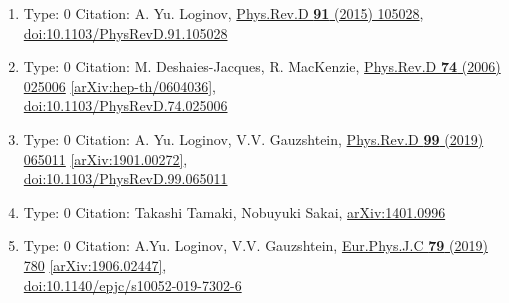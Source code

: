 \documentclass[a4paper,10pt]{article}
\begin{document}
\begin{enumerate}
\begin{enumerate}
  \item Type: 0 Citation: A. Yu. Loginov, \href{https://www.doi.org/10.1103/PhysRevD.91.105028}{Phys.Rev.D {\bf 91} (2015) 105028},\\\href{https://www.doi.org/10.1103/PhysRevD.91.105028}{doi:10.1103/PhysRevD.91.105028}
  \item Type: 0 Citation: M. Deshaies-Jacques, R. MacKenzie, \href{https://www.doi.org/10.1103/PhysRevD.74.025006}{Phys.Rev.D {\bf 74} (2006) 025006}  \href{https://arxiv.org/abs/hep-th/0604036}{[arXiv:hep-th/0604036]},\\\href{https://www.doi.org/10.1103/PhysRevD.74.025006}{doi:10.1103/PhysRevD.74.025006}
  \item Type: 0 Citation: A. Yu. Loginov, V.V. Gauzshtein, \href{https://www.doi.org/10.1103/PhysRevD.99.065011}{Phys.Rev.D {\bf 99} (2019) 065011}  \href{https://arxiv.org/abs/1901.00272}{[arXiv:1901.00272]},\\\href{https://www.doi.org/10.1103/PhysRevD.99.065011}{doi:10.1103/PhysRevD.99.065011}
  \item Type: 0 Citation: Takashi Tamaki, Nobuyuki Sakai, \href{https://arxiv.org/abs/1401.0996}{arXiv:1401.0996}
  \item Type: 0 Citation: A.Yu. Loginov, V.V. Gauzshtein, \href{https://www.doi.org/10.1140/epjc/s10052-019-7302-6}{Eur.Phys.J.C {\bf 79} (2019) 780}  \href{https://arxiv.org/abs/1906.02447}{[arXiv:1906.02447]},\\\href{https://www.doi.org/10.1140/epjc/s10052-019-7302-6}{doi:10.1140/epjc/s10052-019-7302-6}

\end{enumerate}
\end{enumerate}
\end{document}
